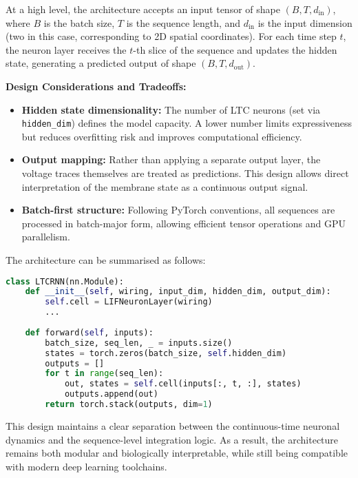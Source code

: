 At a high level, the architecture accepts an input tensor of shape $(B, T, d_{\text{in}})$, where $B$ is the batch size, $T$ is the sequence length, and $d_{\text{in}}$ is the input dimension (two in this case, corresponding to 2D spatial coordinates). For each time step $t$, the neuron layer receives the $t$-th slice of the sequence and updates the hidden state, generating a predicted output of shape $(B, T, d_{\text{out}})$.

\vspace{1em}
\noindent \textbf{Design Considerations and Tradeoffs:}
\begin{itemize}
    \item \textbf{Hidden state dimensionality:} The number of LTC neurons (set via \texttt{hidden\_dim}) defines the model capacity. A lower number limits expressiveness but reduces overfitting risk and improves computational efficiency.
    \item \textbf{Output mapping:} Rather than applying a separate output layer, the voltage traces themselves are treated as predictions. This design allows direct interpretation of the membrane state as a continuous output signal.
    \item \textbf{Batch-first structure:} Following PyTorch conventions, all sequences are processed in batch-major form, allowing efficient tensor operations and GPU parallelism.
\end{itemize}

\noindent The architecture can be summarised as follows:
\begin{lstlisting}[language=Python, caption={Structure of the LTCRNN module}]
class LTCRNN(nn.Module):
    def __init__(self, wiring, input_dim, hidden_dim, output_dim):
        self.cell = LIFNeuronLayer(wiring)
        ...
        
    def forward(self, inputs):
        batch_size, seq_len, _ = inputs.size()
        states = torch.zeros(batch_size, self.hidden_dim)
        outputs = []
        for t in range(seq_len):
            out, states = self.cell(inputs[:, t, :], states)
            outputs.append(out)
        return torch.stack(outputs, dim=1)
\end{lstlisting}

This design maintains a clear separation between the continuous-time neuronal dynamics and the sequence-level integration logic. As a result, the architecture remains both modular and biologically interpretable, while still being compatible with modern deep learning toolchains.

